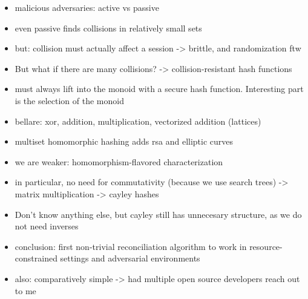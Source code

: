 \documentclass{beamer}
\begin{document}
\begin{itemize}
    \item malicious adversaries: active vs passive
    \item even passive finds collisions in relatively small sets
    \item but: collision must actually affect a session -> brittle, and randomization ftw
    \item But what if there are many collisions? -> collision-resistant hash functions
\end{itemize}

\begin{itemize}
    \item must always lift into the monoid with a secure hash function. Interesting part is the selection of the monoid
    \item bellare: xor, addition, multiplication, vectorized addition (lattices)
    \item multiset homomorphic hashing adds rsa and elliptic curves
    \item we are weaker: homomorphism-flavored characterization
    \item in particular, no need for commutativity (because we use search trees) -> matrix multiplication -> cayley hashes
    \item Don't know anything else, but cayley still has unnecesary structure, as we do not need inverses
\end{itemize}

\begin{itemize}
    \item conclusion: first non-trivial reconciliation algorithm to work in resource-constrained settings and adversarial environments
    \item also: comparatively simple -> had multiple open source developers reach out to me
\end{itemize}
\end{document}
